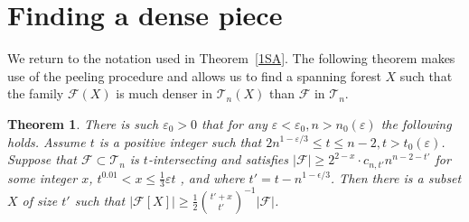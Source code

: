 \documentclass[11pt,letterpaper]{amsart}
\newcommand{\eps}{\varepsilon}
\renewcommand{\le}{\leqslant}
\renewcommand{\ge}{\geqslant}
\newcommand{\ff}{\mathcal{F}}
\newcommand{\T}{\mathcal{T}}
\newtheorem{theorem}{Theorem}
\begin{document}
\section{Finding a dense piece}
We return to the notation used in Theorem~\ref{1SA}. The following theorem makes use of the peeling procedure and allows us to find a spanning forest $X$ such that the family $\ff(X)$ is much denser in $\T_n(X)$ than $\ff$ in $\T_n$.

\begin{theorem}\label{theorem_dense} There is such $\eps_0 > 0$ that for any $\eps < \eps_0, n > n_0(\eps)$ the following holds. Assume $t$ is a positive integer such that $2n^{1-\eps/3} \le t \le n-2, t > t_0(\eps)$.  Suppose that $\ff\subset \T_n$ is $t$-intersecting and satisfies $|\ff|\ge 2^{2-x}\cdot c_{n, t'}n^{n-2-t'}$ for some integer $x$, $t^{0.01}<x\le\frac 13\eps t$ , and where $t' = t- n^{1-\epsilon/3}$. Then there is a subset $X$ of size $t'$ such that $|\ff[X]|\ge \frac 12 {t'+x\choose t'}^{-1}|\ff|$.
\end{theorem}
\end{document}
